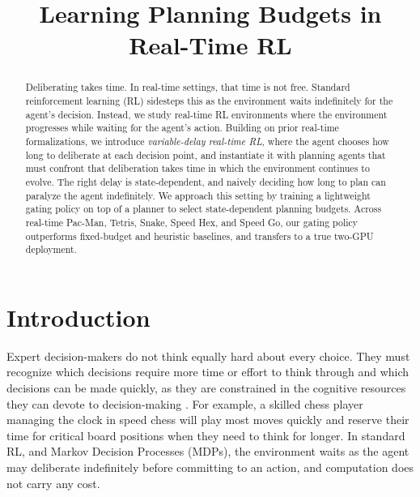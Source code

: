 \documentclass{article}
\title{Learning Planning Budgets in Real-Time RL}
\author{\todo{Author list}}
\begin{document}
\maketitle

\begin{abstract}
Deliberating takes time. In real-time settings, that time is not free.
Standard reinforcement learning (RL) sidesteps this as the environment
waits indefinitely for the agent's decision.
Instead, we study real-time RL environments where the environment
progresses while waiting for the agent's action.
Building on prior real-time formalizations, we introduce
\emph{variable-delay real-time RL}, where the agent chooses how long
to deliberate at each decision point, and instantiate it with planning
agents that must confront that deliberation takes time in which the
environment continues to evolve.
The right delay is state-dependent, and naively deciding how long to
plan can paralyze the agent indefinitely.
We approach this setting by training a lightweight gating policy on
top of a planner to select state-dependent planning budgets.
Across real-time Pac-Man, Tetris, Snake, Speed Hex,
and Speed Go, our gating policy outperforms fixed-budget and
heuristic baselines, and transfers to a true two-GPU deployment.
\end{abstract}


\section{Introduction}

Expert decision-makers do not think equally hard about every choice.
They must recognize which decisions require more time or effort to
think through and which decisions can be made quickly, as they are
constrained in the cognitive resources they can devote to
decision-making \citep{otto2019opportunity}.
For example, a skilled chess player managing the clock in speed chess
will play most moves quickly and reserve their time for critical board
positions when they need to think for longer.
In standard RL, and Markov Decision Processes (MDPs), the environment
waits as the agent may deliberate indefinitely before committing to an
action, and computation does not carry any cost.
\end{document}
